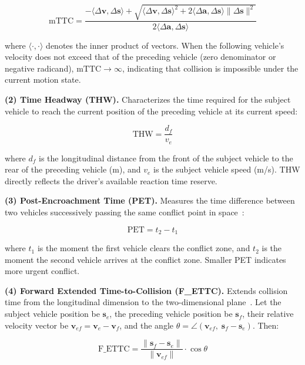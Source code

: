 \documentclass[preprint,review,12pt,a4paper]{elsarticle}
\begin{document}
\begin{equation}
\text{mTTC} = \frac{-\langle\Delta\mathbf{v}, \Delta\mathbf{s}\rangle + \sqrt{\langle\Delta\mathbf{v}, \Delta\mathbf{s}\rangle^2 + 2\langle\Delta\mathbf{a}, \Delta\mathbf{s}\rangle\|\Delta\mathbf{s}\|^2}}{2\langle\Delta\mathbf{a}, \Delta\mathbf{s}\rangle}
\end{equation}

where $\langle\cdot,\cdot\rangle$ denotes the inner product of vectors. When the following vehicle's velocity does not exceed that of the preceding vehicle (zero denominator or negative radicand), $\text{mTTC} \to \infty$, indicating that collision is impossible under the current motion state.

\textbf{(2) Time Headway (THW).} Characterizes the time required for the subject vehicle to reach the current position of the preceding vehicle at its current speed:

\begin{equation}
\text{THW} = \frac{d_{\!f}}{v_e}
\end{equation}

where $d_{\!f}$ is the longitudinal distance from the front of the subject vehicle to the rear of the preceding vehicle (m), and $v_e$ is the subject vehicle speed (m/s). THW directly reflects the driver's available reaction time reserve.

\textbf{(3) Post-Encroachment Time (PET).} Measures the time difference between two vehicles successively passing the same conflict point in space~\cite{C04}:

\begin{equation}
\text{PET} = t_{2} - t_{1}
\end{equation}

where $t_1$ is the moment the first vehicle clears the conflict zone, and $t_2$ is the moment the second vehicle arrives at the conflict zone. Smaller PET indicates more urgent conflict.

\textbf{(4) Forward Extended Time-to-Collision (F\_ETTC).} Extends collision time from the longitudinal dimension to the two-dimensional plane~\cite{C03}. Let the subject vehicle position be $\mathbf{s}_e$, the preceding vehicle position be $\mathbf{s}_f$, their relative velocity vector be $\mathbf{v}_{ef} = \mathbf{v}_e - \mathbf{v}_f$, and the angle $\theta = \angle(\mathbf{v}_{ef},\; \mathbf{s}_f - \mathbf{s}_e)$. Then:

\begin{equation}
\text{F\_ETTC} = \frac{\|\mathbf{s}_f - \mathbf{s}_e\|}{\|\mathbf{v}_{ef}\|} \cdot \cos\theta
\end{equation}
\end{document}
